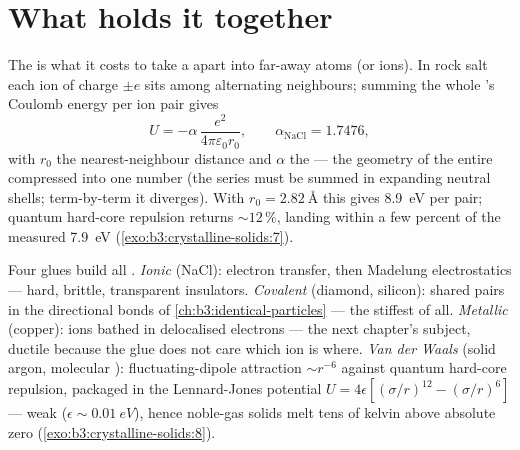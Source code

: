 \section{What holds it together}

\begin{proposition}\label{prop:b3:crystalline-solids:madelung}
The \emph{} is what it costs to take a  apart
into far-away atoms (or ions). In rock salt each ion of charge
$\pm e$ sits among alternating neighbours; summing the whole
's Coulomb energy per ion pair gives
\[
U = -\alpha\,\frac{e^2}{4\pi\varepsilon_0 r_0} ,
\qquad \alpha_{\text{NaCl}} = 1.7476 ,
\]
with $r_0$ the nearest-neighbour distance and $\alpha$ the
\emph{} --- the geometry of the entire 
compressed into one number (the series must be summed in expanding
neutral shells; term-by-term it diverges). With $r_0 =
\qty{2.82}{\angstrom}$ this gives \qty{8.9}{eV} per pair;
quantum hard-core repulsion returns $\sim12\,\%$, landing within a
few percent of the measured \qty{7.9}{eV}
(\cref{exo:b3:crystalline-solids:7}).
\end{proposition}
\admitted

\begin{remark}\label{rem:b3:crystalline-solids:bonds}
Four glues build all . \emph{Ionic} (NaCl): electron
transfer, then Madelung electrostatics --- hard, brittle,
transparent insulators. \emph{Covalent} (diamond, silicon): shared
pairs in the directional bonds of
\cref{ch:b3:identical-particles} --- the stiffest of all.
\emph{Metallic} (copper): ions bathed in delocalised electrons ---
the next chapter's subject, ductile because the glue does not care
which ion is where. \emph{Van der Waals} (solid argon, molecular
): fluctuating-dipole attraction $\sim r^{-6}$ against
quantum hard-core repulsion, packaged in the Lennard-Jones
potential $U = 4\epsilon[(\sigma/r)^{12} - (\sigma/r)^6]$ --- weak
($\epsilon \sim \qty{0.01}{eV}$), hence noble-gas solids melt
tens of kelvin above absolute zero
(\cref{exo:b3:crystalline-solids:8}).
\end{remark}


